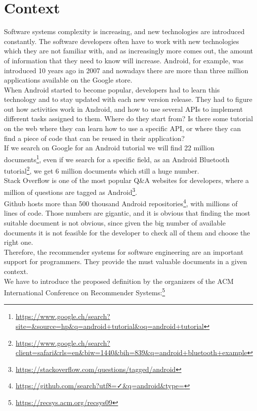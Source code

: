 \documentclass[12pt,mscthesis]{usiinfthesis}
\begin{document}
	\section{Context}
	Software systems complexity is increasing, and new technologies are introduced constantly. The software developers often have to work with new technologies which they are not familiar with, and as increasingly more comes out, the amount of information that they need to know will increase. Android, for example, was introduced 10 years ago in 2007 and nowadays there are more than three million applications available on the Google store. \\
	When Android started to become popular, developers had to learn this technology and to stay updated with each new version release. 
	They had to figure out how activities work in Android, and how to use several APIs to implement different tasks assigned to them. Where do they start from? Is there some tutorial on the web where they can learn how to use a specific API, or where they can find a piece of code that can be reused in their application? \\
	If we search on Google for an Android tutorial we will find 22 million documents\footnote{\url{https://www.google.ch/search?site=&source=hp&q=android+tutorial&oq=android+tutorial}}, even if we search for a specific field, as an Android Bluetooth tutorial\footnote{\url{https://www.google.ch/search?client=safari&rls=en&biw=1440&bih=839&q=android+bluetooth+example}}, we get 6 million documents which still a huge number.\\
	Stack Overflow is one of the most popular Q\&A websites for developers, where a million of questions are tagged as Android\footnote{\url{https://stackoverflow.com/questions/tagged/android}}. \\
	Github hosts more than 500 thousand Android repositories\footnote{\url{https://github.com/search?utf8=✓&q=android&type=}}, with millions of lines of code. Those numbers are gigantic, and it is obvious that finding the most suitable document is not obvious, since given the big number of available documents it is not feasible for the developer to check all of them and choose the right one.\\
	Therefore, the recommender systems for software engineering are an important support for programmers. They provide the must valuable documents in a given context.\\

	We have to introduce the proposed definition by the organizers of the ACM International Conference on Recommender Systems:\footnote{\url{https://recsys.acm.org/recsys09}} \\
\end{document}
